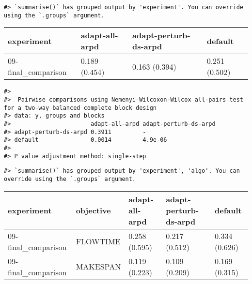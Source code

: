 \documentclass[
]{article}
\begin{document}
\begin{verbatim}
#> `summarise()` has grouped output by 'experiment'. You can override using the `.groups` argument.
\end{verbatim}

\begin{longtable}[]{@{}llll@{}}
\toprule
experiment & adapt-all-arpd & adapt-perturb-ds-arpd & default \\
\midrule
\endhead
09-final\_comparison & 0.189 (0.454) & 0.163 (0.394) & 0.251 (0.502) \\
\bottomrule
\end{longtable}

\begin{verbatim}
#> 
#>  Pairwise comparisons using Nemenyi-Wilcoxon-Wilcox all-pairs test for a two-way balanced complete block design
#> data: y, groups and blocks
#>                       adapt-all-arpd adapt-perturb-ds-arpd
#> adapt-perturb-ds-arpd 0.3911         -                    
#> default               0.0014         4.9e-06
#> 
#> P value adjustment method: single-step
\end{verbatim}

\begin{verbatim}
#> `summarise()` has grouped output by 'experiment', 'algo'. You can override using the `.groups` argument.
\end{verbatim}

\begin{longtable}[]{@{}lllll@{}}
\toprule
experiment & objective & adapt-all-arpd & adapt-perturb-ds-arpd &
default \\
\midrule
\endhead
09-final\_comparison & FLOWTIME & 0.258 (0.595) & 0.217 (0.512) & 0.334
(0.626) \\
09-final\_comparison & MAKESPAN & 0.119 (0.223) & 0.109 (0.209) & 0.169
(0.315) \\
\bottomrule
\end{longtable}
\end{document}
